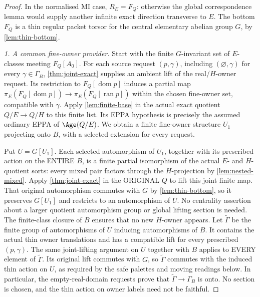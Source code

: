 \begin{proof}
In the normalised MI case, \(R_E=F_Q\): otherwise the global
correspondence lemma would supply another infinite exact direction
transverse to \(E\). The bottom \(F_Q\) is a thin regular packet
torsor for the central elementary abelian group \(G\), by
\cref{lem:thin-bottom}.

\medskip\noindent
\emph{1. A common fine-owner provider.}
Start with the finite \(G\)-invariant set of \(E\)-classes
meeting \(F_Q[A_0]\). For each source request \((p,\gamma)\),
including \((\varnothing,\gamma)\) for every
\(\gamma\in\Gamma_B\), \cref{thm:joint-exact} supplies an
ambient lift of the real/\(H\)-owner request. Its restriction
to \(F_Q[\operatorname{dom}p]\) induces a partial map
\(\pi_E(F_Q[\operatorname{dom}p])\to
\pi_E(F_Q[\operatorname{ran}p])\) within the chosen fine-owner
set, compatible with \(\gamma\). Apply
\cref{lem:finite-base} in the actual exact quotient
\(Q/E\to Q/H\) to this finite list. Its EPPA hypothesis is
precisely the assumed ordinary EPPA of \(\Age(Q/E)\).
We obtain a finite fine-owner structure \(U_1\) projecting onto
\(B\), with a selected extension for every request.

Put \(U=G[U_1]\). Each selected automorphism of \(U_1\),
together with its prescribed action on the ENTIRE \(B\), is a
finite partial isomorphism of the actual \(E\)- and \(H\)-quotient
sorts: every mixed pair factors through the \(H\)-projection by
\cref{lem:nested-mixed}. Apply \cref{thm:joint-exact} in the
ORIGINAL \(Q\) to lift this joint finite map. That original
automorphism commutes with \(G\) by \cref{lem:thin-bottom},
so it preserves \(G[U_1]\) and restricts to an automorphism
of \(U\). No centrality assertion about a larger quotient
automorphism group or global lifting section is needed.
The finite-class closure of \(B\) ensures that no new
\(H\)-owner appears. Let \(\widetilde\Gamma\) be the finite
group of automorphisms of \(U\) inducing automorphisms of
\(B\). It contains the actual thin owner translations and
has a compatible lift for every prescribed \((p,\gamma)\).
The same joint-lifting argument on \(U\) together with \(B\)
applies to EVERY element of \(\widetilde\Gamma\). Its original
lift commutes with \(G\), so \(\widetilde\Gamma\) commutes
with the induced thin action on \(U\), as required by the
safe palettes and moving readings below.
In particular, the empty-real-domain requests prove that
\(\widetilde\Gamma\to\Gamma_B\) is onto. No section is chosen,
and the thin action on owner labels need not be faithful.


\end{proof}
